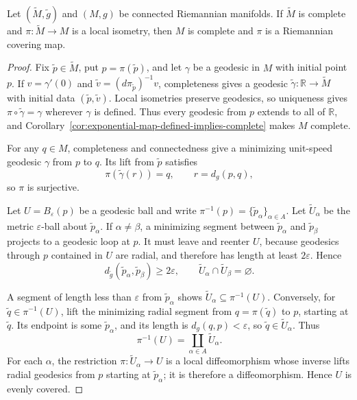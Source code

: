 \begin{theorem}
\label{thm:completeness-of-covering-map}
\leanok
{}
Let $(\widetilde M,\widetilde g)$ and $(M,g)$ be connected Riemannian
manifolds. If $\widetilde M$ is complete and
$\pi\colon\widetilde M\to M$ is a local isometry, then $M$ is complete and
$\pi$ is a Riemannian covering map.
\end{theorem}

\begin{proof}
\sketch Fix $\widetilde p\in\widetilde M$, put $p=\pi(\widetilde p)$, and let
$\gamma$ be a geodesic in $M$ with initial point $p$. If
$v=\gamma'(0)$ and
$\widetilde v=(d\pi_{\widetilde p})^{-1}v$, completeness gives a geodesic
$\widetilde\gamma\colon\mathbb R\to\widetilde M$ with initial data
$(\widetilde p,\widetilde v)$. Local isometries preserve geodesics, so
uniqueness gives $\pi\circ\widetilde\gamma=\gamma$ wherever $\gamma$ is
defined. Thus every geodesic from $p$ extends to all of $\mathbb R$, and
Corollary~\ref{cor:exponential-map-defined-implies-complete} makes $M$
complete.

For any $q\in M$, completeness and connectedness give a minimizing unit-speed
geodesic $\gamma$ from $p$ to $q$. Its lift from $\widetilde p$ satisfies
\[
\pi(\widetilde\gamma(r))=q,
\qquad r=d_g(p,q),
\]
so $\pi$ is surjective.

Let $U=B_\varepsilon(p)$ be a geodesic ball and write
$\pi^{-1}(p)=\{\widetilde p_\alpha\}_{\alpha\in A}$. Let
$\widetilde U_\alpha$ be the metric $\varepsilon$-ball about
$\widetilde p_\alpha$. If $\alpha\ne\beta$, a minimizing segment between
$\widetilde p_\alpha$ and $\widetilde p_\beta$ projects to a geodesic loop at
$p$. It must leave and reenter $U$, because geodesics through $p$ contained in
$U$ are radial, and therefore has length at least $2\varepsilon$. Hence
\[
d_{\widetilde g}(\widetilde p_\alpha,\widetilde p_\beta)
\geq2\varepsilon,
\qquad
\widetilde U_\alpha\cap\widetilde U_\beta=\varnothing.
\]

A segment of length less than $\varepsilon$ from $\widetilde p_\alpha$ shows
$\widetilde U_\alpha\subseteq\pi^{-1}(U)$. Conversely, for
$\widetilde q\in\pi^{-1}(U)$, lift the minimizing radial segment from
$q=\pi(\widetilde q)$ to $p$, starting at $\widetilde q$. Its endpoint is
some $\widetilde p_\alpha$, and its length is
$d_g(q,p)<\varepsilon$, so $\widetilde q\in\widetilde U_\alpha$. Thus
\[
\pi^{-1}(U)=\coprod_{\alpha\in A}\widetilde U_\alpha.
\]
For each $\alpha$, the restriction
$\pi\colon\widetilde U_\alpha\to U$ is a local diffeomorphism whose inverse
lifts radial geodesics from $p$ starting at $\widetilde p_\alpha$; it is
therefore a diffeomorphism. Hence $U$ is evenly covered.
\end{proof}


